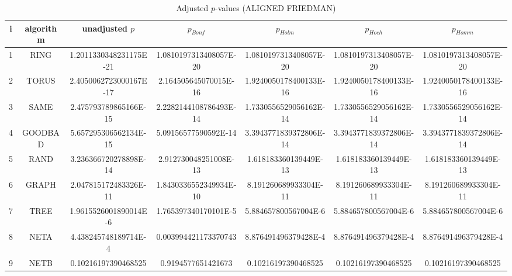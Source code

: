 \documentclass[a4paper,10pt]{article}
\begin{document}
\begin{landscape}
\begin{table}[!htp]
\centering\scriptsize
\caption{Adjusted $p$-values (ALIGNED FRIEDMAN)}
\begin{tabular}{ccccccc}
i&algorithm&unadjusted $p$&$p_{Bonf}$&$p_{Holm}$&$p_{Hoch}$&$p_{Homm}$\\
\hline
1& RING&1.2011330348231175E-21&1.0810197313408057E-20&1.0810197313408057E-20&1.0810197313408057E-20&1.0810197313408057E-20\\
2& TORUS&2.4050062723000167E-17&2.164505645070015E-16&1.9240050178400133E-16&1.9240050178400133E-16&1.9240050178400133E-16\\
3& SAME&2.475793789865166E-15&2.2282144108786493E-14&1.7330556529056162E-14&1.7330556529056162E-14&1.7330556529056162E-14\\
4& GOODBAD&5.657295306562134E-15&5.09156577590592E-14&3.3943771839372806E-14&3.3943771839372806E-14&3.3943771839372806E-14\\
5& RAND&3.236366720278898E-14&2.912730048251008E-13&1.618183360139449E-13&1.618183360139449E-13&1.618183360139449E-13\\
6& GRAPH&2.047815172483326E-11&1.8430336552349934E-10&8.191260689933304E-11&8.191260689933304E-11&8.191260689933304E-11\\
7& TREE&1.9615526001890014E-6&1.765397340170101E-5&5.884657800567004E-6&5.884657800567004E-6&5.884657800567004E-6\\
8& NETA&4.438245748189714E-4&0.003994421173370743&8.876491496379428E-4&8.876491496379428E-4&8.876491496379428E-4\\
9& NETB&0.10216197390468525&0.9194577651421673&0.10216197390468525&0.10216197390468525&0.10216197390468525\\
\hline
\end{tabular}
\end{table}


\end{landscape}
\end{document}
